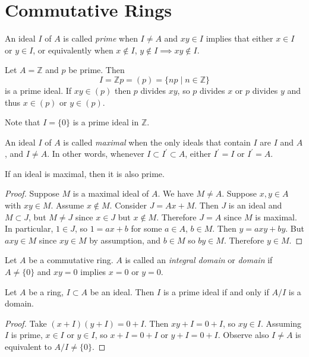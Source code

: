 \section*{Commutative Rings}

\begin{defn}
An ideal $I$ of $A$ is called \emph{prime} when $I \neq A$ and
$xy \in I$ implies that either $x \in I$ or $y \in I$, or equivalently
when $x \notin I$, $y \notin I \implies x y \notin I$.
\end{defn}

\begin{xmpl}
Let $A = \mathbb{Z}$ and $p$ be prime. Then
$$
I = \mathbb{Z} p = (p) = \{ n p \mid n \in \mathbb{Z} \}
$$
is a prime ideal. If $xy \in (p)$ then $p$ divides $xy$, so
$p$ divides $x$ or $p$ divides $y$ and thus $x \in (p)$ or $y \in
(p)$.

Note that $I = \{ 0 \}$ is a prime ideal in $\mathbb{Z}$.
\end{xmpl}

\begin{defn}
An ideal $I$ of $A$ is called \emph{maximal} when
the only ideals that contain $I$ are $I$ and $A$, and
$I \neq A$. In other words, whenever $I \subset I^\prime \subset A$,
either $I^\prime = I$ or $I^\prime = A$.
\end{defn}

\begin{prop}
If an ideal is maximal, then it is also prime.
\end{prop}
\begin{proof}
Suppose $M$ is a
maximal ideal of $A$. We have $M \neq A$. Suppose $x, y \in A$ with
$xy \in M$. Assume $x \notin M$. Consider $J = Ax + M$. Then $J$ is an
ideal and $M \subset J$, but $M \neq J$ since $x \in J$ but $x \notin
M$. Therefore $J = A$ since $M$ is maximal. In particular, $1 \in J$,
so $1 = ax + b$ for some $a \in A$, $b \in M$. Then $y = axy +
by$. But $a x y \in M$ since $xy \in M$ by assumption, and $b \in M$
so $by \in M$. Therefore $y \in M$.
\end{proof}

\begin{defn}
Let $A$ be a commutative ring. $A$ is called an \emph{integral domain}
or \emph{domain} if $A \neq \{ 0 \}$ and $x y = 0$ implies $x = 0$ or
$y = 0$.
\end{defn}

\begin{prop}
Let $A$ be a ring, $I \subset A$ be an ideal. Then $I$ is a prime
ideal if and only if $A / I$ is a domain.
\end{prop}
\begin{proof}
Take $(x + I)(y + I) = 0 + I$. Then $xy + I = 0 + I$, so $xy \in I$.
Assuming $I$ is prime, $x \in I$ or $y \in I$, so $x + I = 0 + I$ or
$y + I = 0 + I$. Observe also $I \neq A$ is equivalent to
$A / I \neq \{ 0 \}$.
\end{proof}

